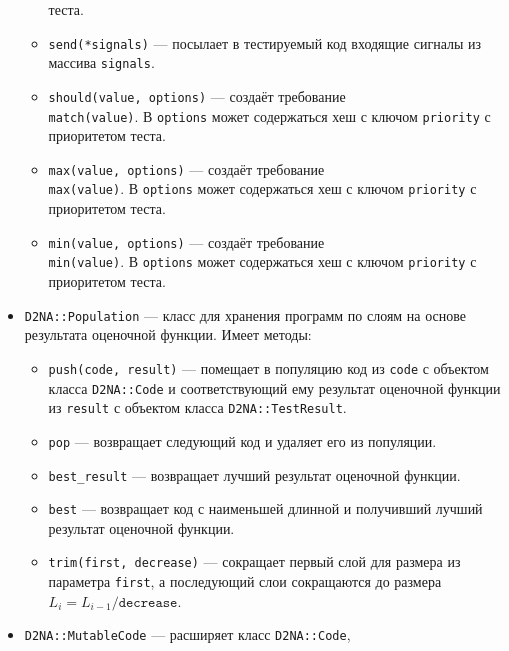 \documentclass[utf8,a5paper,portrait,10pt,twoside]{eskdtext}
\begin{document}
\begin{itemize}
\begin{itemize}
                теста.
          \item \texttt{send(*signals)} — посылает в тестируемый код входящие
                сигналы из массива \texttt{signals}.
          \item \texttt{should(value, options)} — создаёт требование\\
                \texttt{match(value)}. В \texttt{options} может содержаться хеш
                с ключом \texttt{priority} с приоритетом теста.
          \item \texttt{max(value, options)} — создаёт требование\\
                \texttt{max(value)}. В \texttt{options} может содержаться хеш
                с ключом \texttt{priority} с приоритетом теста.
          \item \texttt{min(value, options)} — создаёт требование\\
                \texttt{min(value)}. В \texttt{options} может содержаться хеш
                с ключом \texttt{priority} с приоритетом теста.
        \end{itemize}
  \item \texttt{D2NA::Population} — класс для хранения программ по слоям на
        основе результата оценочной функции. Имеет методы:
        \begin{itemize}
          \item \texttt{push(code, result)} — помещает в популяцию код из
                \texttt{code} с объектом класса \texttt{D2NA::Code} и
                соответствующий ему результат оценочной функции из
                \texttt{result} с объектом класса \texttt{D2NA::TestResult}.
          \item \texttt{pop} — возвращает следующий код и удаляет его из
                популяции.
          \item \texttt{best\_result} — возвращает лучший результат оценочной
                функции.
          \item \texttt{best} — возвращает код с наименьшей длинной и получивший
                лучший результат оценочной функции.
          \item \texttt{trim(first, decrease)} — сокращает первый слой для
                размера из параметра \texttt{first}, а последующий слои
                сокращаются до размера\\ $L_i = L_{i-1} / \texttt{decrease}$.
        \end{itemize}
 \item \texttt{D2NA::MutableCode} — расширяет класс \texttt{D2NA::Code},

\end{itemize}
\end{document}
